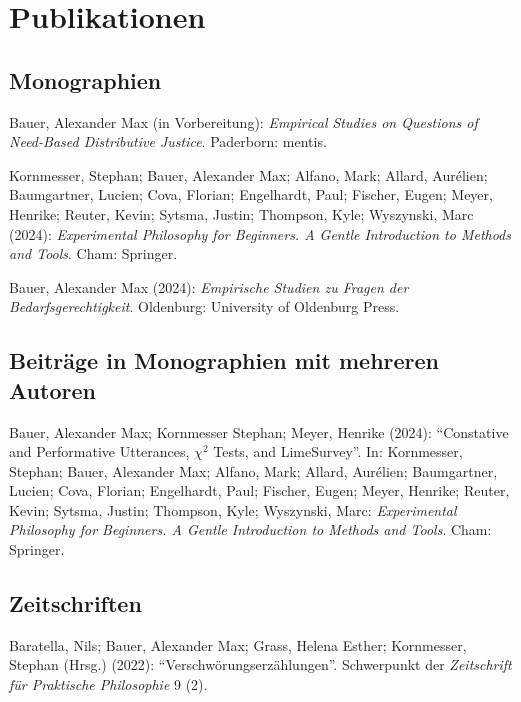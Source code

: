 \documentclass[a4paper,10pt]{article}
\newenvironment{literature}{%
   \parskip6pt\parindent0pt\raggedright
   \def\lititem{\hangindent=1cm\hangafter1}}{%
   \par\ignorespaces}
\begin{document}
\clearpage
\section{Publikationen}
\subsection*{Monographien}
\begin{literature}
\lititem Bauer, Alexander Max (in Vorbereitung): \textit{Empirical Studies on Questions of Need-Based Distributive Justice}. Paderborn: mentis.

\lititem Kornmesser, Stephan; Bauer, Alexander Max; Alfano, Mark; Allard, Aurélien; Baumgartner, Lucien; Cova, Florian; Engelhardt, Paul; Fischer, Eugen; Meyer, Henrike; Reuter, Kevin; Sytsma, Justin; Thompson, Kyle; Wyszynski, Marc (2024): \textit{Experimental Philosophy for Beginners. A Gentle Introduction to Methods and Tools}. Cham: Springer.

\lititem Bauer, Alexander Max (2024): \textit{Empirische Studien zu Fragen der Bedarfsgerechtigkeit}. Oldenburg: University of Oldenburg Press.
\end{literature}

\subsection*{Beiträge in Monographien mit mehreren Autoren}
\begin{literature}
\lititem Bauer, Alexander Max; Kornmesser Stephan; Meyer, Henrike (2024): \enquote{Constative and Performative Utterances, $\chi^2$ Tests, and LimeSurvey}. In: Kornmesser, Stephan; Bauer, Alexander Max; Alfano, Mark; Allard, Aurélien; Baumgartner, Lucien; Cova, Florian; Engelhardt, Paul; Fischer, Eugen; Meyer, Henrike; Reuter, Kevin; Sytsma, Justin; Thompson, Kyle; Wyszynski, Marc: \textit{Experimental Philosophy for Beginners. A Gentle Introduction to Methods and Tools}. Cham: Springer.
\end{literature}

\subsection*{Zeitschriften}
\begin{literature}
\lititem Baratella, Nils; Bauer, Alexander Max; Grass, Helena Esther; Kornmesser, Stephan (Hrsg.) (2022): \enquote{Verschwörungserzählungen}. Schwerpunkt der \textit{Zeitschrift für Praktische Philosophie} 9 (2).
\end{literature}
\end{document}
